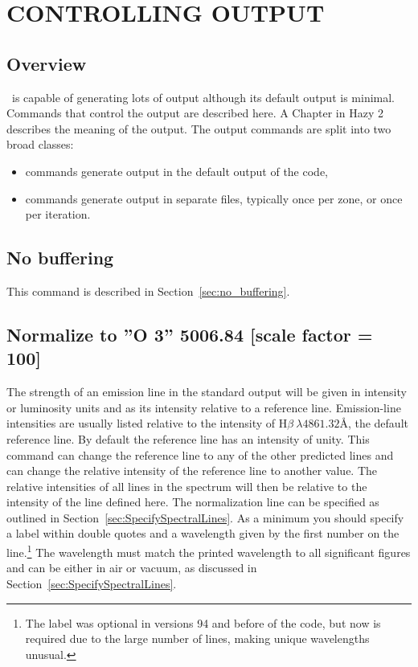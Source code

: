 \chapter{CONTROLLING OUTPUT}
\label{sec:ControllingOutput}

\section{Overview}

\Cloudy\ is capable of generating lots of output although its
default output is minimal.
Commands that control the output are described here.
A Chapter in Hazy 2
describes the meaning of the output.  The output commands are split into
two broad classes: 
\begin{itemize}
\item{} commands generate output in the
default output of the code, 
\item{} commands generate output in separate files, typically
once per zone, or once per iteration.
\end{itemize}

\section{No buffering}

This command is described in Section~\ref{sec:no_buffering}.

\section{Normalize to ''O  3'' 5006.84 [scale factor = 100]}

The strength of an emission line in the standard output will be given
in intensity or luminosity units and as its intensity relative to a reference
line.  
Emission-line intensities are usually listed relative to the intensity
of H$\beta\ \lambda 4861.32$\AA, the default reference line.  By default the reference line
has an intensity of unity.  This command can change the reference line to
any of the other predicted lines and can change the relative intensity of
the reference line to another value.  The relative intensities of all lines
in the spectrum will then be relative to the intensity of the line defined here.
The normalization line can be specified as outlined in Section~\ref{sec:SpecifySpectralLines}.
As a minimum you should specify a label within double quotes and a wavelength given by the first
number on the line.\footnote{The label was optional in versions 94 and before of the code, but
now is required due to the large number of lines, making unique wavelengths
unusual.}
The wavelength must match the printed wavelength to
all significant figures and can be either in air or vacuum, as discussed in
Section~\ref{sec:SpecifySpectralLines}.

